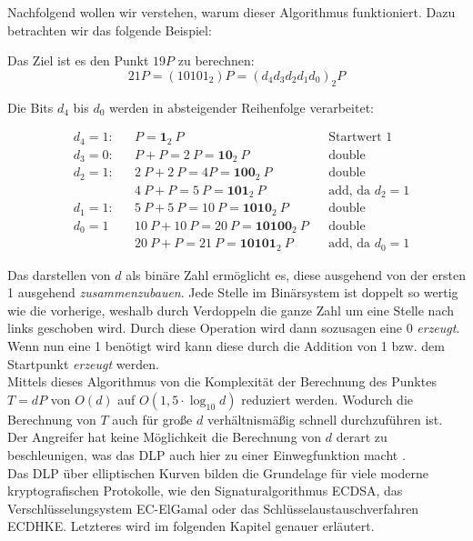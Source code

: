 Nachfolgend wollen wir verstehen, warum dieser Algorithmus funktioniert. Dazu betrachten wir das folgende Beispiel:

Das Ziel ist es den Punkt $19	 P$ zu berechnen:
$$21P = (10101_2)P = (d_4 d_3 d_2 d_1 d_0)_2 P$$

Die Bits $d_4$ bis $d_0$ werden in absteigender Reihenfolge verarbeitet:

\begin{align*}
&d_4 = 1:	&&P = \boldsymbol{1}_2\ P  							&&\text{Startwert 1}\\
&d_3 = 0: 	&&P + P = 2\ P = \boldsymbol{10}_2\ P 				&&\text{double}\\
&d_2 = 1: 	&&2\ P + 2\ P = 4 P = \boldsymbol{100}_2\ P 			&&\text{double}\\
&			&&4\ P + P = 5\ P = \boldsymbol{101}_2\ P 			&&\text{add, da $d_2 = 1$}\\
&d_1 = 1: 	&&5\ P + 5\ P = 10\ P = \boldsymbol{1010}_2\ P 		&&\text{double}\\
&d_0 = 1  	&&10\ P + 10\ P = 20\ P = \boldsymbol{10100}_2\ P 	&&\text{double}\\
&			&&20\ P + P = 21\ P = \boldsymbol{10101}_2\ P 		&&\text{add, da $d_0 = 1$}
\end{align*}

Das darstellen von $d$ als binäre Zahl ermöglicht es, diese ausgehend von der ersten 1 ausgehend \textit{zusammenzubauen}. Jede Stelle im Binärsystem ist doppelt so wertig wie die vorherige, weshalb durch Verdoppeln die ganze Zahl um eine Stelle nach links geschoben wird. Durch diese Operation wird dann sozusagen eine 0 \textit{erzeugt}. Wenn nun eine 1 benötigt wird kann diese durch die Addition von 1 bzw. dem Startpunkt \textit{erzeugt} werden.\\

Mittels dieses Algorithmus von die Komplexität der Berechnung des Punktes $T = dP$ von $O(d)$ auf $O(1,5 \cdot \log_{10}d)$ reduziert werden. Wodurch die Berechnung von $T$ auch für große $d$ verhältnismäßig schnell durchzuführen ist. Der Angreifer hat keine Möglichkeit die Berechnung von $d$ derart zu beschleunigen, was das DLP auch hier zu einer Einwegfunktion macht \cite[280-284]{Paar.2016}.\\

Das DLP über elliptischen Kurven bilden die Grundelage für viele moderne kryptografischen Protokolle, wie den Signaturalgorithmus ECDSA, das Verschlüsselungsystem EC-ElGamal oder das Schlüsselaustauschverfahren ECDHKE. Letzteres wird im folgenden Kapitel genauer erläutert.

